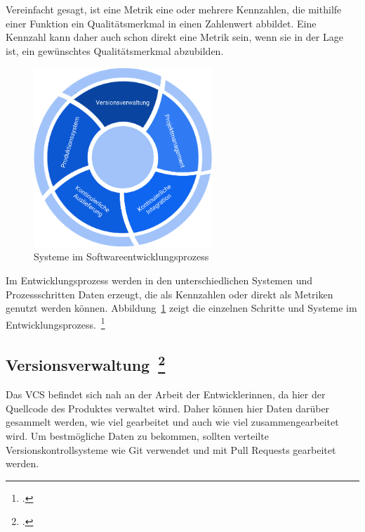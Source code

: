 Vereinfacht gesagt, ist eine Metrik eine oder mehrere Kennzahlen, die mithilfe einer Funktion ein Qualitätsmerkmal in einen Zahlenwert abbildet.
Eine Kennzahl kann daher auch schon direkt eine Metrik sein, wenn sie in der Lage ist, ein gewünschtes Qualitätsmerkmal abzubilden.

\begin{savenotes}
  \begin{figure}[H] 
    \centering
       \includegraphics[width=0.6\textwidth]{img/software-development-lifecycle.png}
    \caption[Systeme im Softwareentwicklungsprozess]{Systeme im Softwareentwicklungsprozess~\label{fig:sdlc}}
  \end{figure}
\end{savenotes}

Im Entwicklungsprozess werden in den unterschiedlichen Systemen und Prozessschritten Daten erzeugt, die als Kennzahlen oder direkt als Metriken genutzt werden können.
Abbildung~\ref{fig:sdlc} zeigt die einzelnen Schritte und Systeme im Entwicklungsprozess.~\footcite[vgl.][S.8]{davis_agile_2015}

\clearpage
\subsection[Versionsverwaltung]{Versionsverwaltung~\footcite[vgl.][S.62ff]{davis_agile_2015}}

Das \acf{VCS} befindet sich nah an der Arbeit der Entwicklerinnen, da hier der Quellcode des Produktes verwaltet wird.
Daher können hier Daten darüber gesammelt werden, wie viel gearbeitet und auch wie viel zusammengearbeitet wird.
Um bestmögliche Daten zu bekommen, sollten verteilte Versionskontrollsysteme wie Git verwendet und mit Pull Requests gearbeitet werden.

